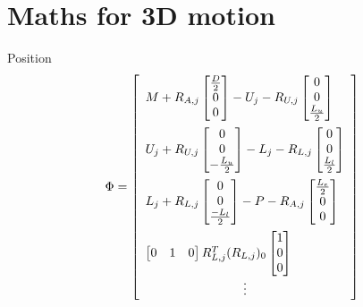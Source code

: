 \section{Maths for 3D motion}
Position
\begin{equation}
    \Phi=
    \begin{bmatrix}
    \begin{array}{l} %
    M+R_{A,j}\begin{bmatrix}\frac{D}{2} \\ 0 \\0 \end{bmatrix} - U_j - R_{U,j} \begin{bmatrix}0\\ 0 \\\frac{L_u}{2}  \end{bmatrix}  \vspace{0.5em}\\
    U_j+R_{U,j}\begin{bmatrix}0 \\ 0 \\-\frac{L_u}{2} \end{bmatrix} - L_j - R_{L,j} \begin{bmatrix}0\\ 0 \\\frac{L_l}{2}  \end{bmatrix}  \vspace{0.5em}\\
    L_j+R_{L,j}\begin{bmatrix}0 \\ 0 \\ \frac{-L_l}{2} \end{bmatrix} - P - R_{A,j} \begin{bmatrix}\frac{L_e}{2}\\ 0 \\0 \end{bmatrix}  \vspace{0.5em} \\
    \begin{bmatrix} 0 & 1 & 0 \end{bmatrix}R_{L,j}^T(R_{L,j})_0\begin{bmatrix} 1\\ 0 \\0\end{bmatrix}
    \end{array}\\
    \vdots
    \end{bmatrix}
\end{equation}

